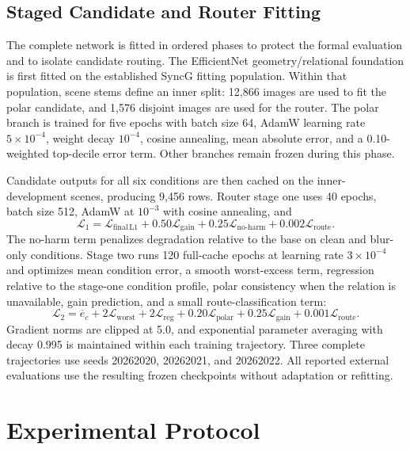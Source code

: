 \documentclass[electronics,article,submit,oneauthor]{Definitions/mdpi}
\begin{document}
\subsection{Staged Candidate and Router Fitting}
\label{subsec:training}

The complete network is fitted in ordered phases to protect the formal evaluation and to isolate candidate routing. The EfficientNet geometry/relational foundation is first fitted on the established SyncG fitting population. Within that population, scene stems define an inner split: 12,866 images are used to fit the polar candidate, and 1,576 disjoint images are used for the router. The polar branch is trained for five epochs with batch size 64, AdamW learning rate $5\times10^{-4}$, weight decay $10^{-4}$, cosine annealing, mean absolute error, and a 0.10-weighted top-decile error term. Other branches remain frozen during this phase.

Candidate outputs for all six conditions are then cached on the inner-development scenes, producing 9,456 rows. Router stage one uses 40 epochs, batch size 512, AdamW at $10^{-3}$ with cosine annealing, and
\begin{equation}
\mathcal{L}_1=\mathcal{L}_{\mathrm{final\,L1}}+0.50\mathcal{L}_{\mathrm{gain}}
+0.25\mathcal{L}_{\mathrm{no\mbox{-}harm}}+0.002\mathcal{L}_{\mathrm{route}}.
\label{eq:router_stage1}
\end{equation}
The no-harm term penalizes degradation relative to the base on clean and blur-only conditions. Stage two runs 120 full-cache epochs at learning rate $3\times10^{-4}$ and optimizes mean condition error, a smooth worst-excess term, regression relative to the stage-one condition profile, polar consistency when the relation is unavailable, gain prediction, and a small route-classification term:
\begin{equation}
\mathcal{L}_2=\overline{e}_{c}+2\mathcal{L}_{\mathrm{worst}}+2\mathcal{L}_{\mathrm{reg}}
+0.20\mathcal{L}_{\mathrm{polar}}+0.25\mathcal{L}_{\mathrm{gain}}+0.001\mathcal{L}_{\mathrm{route}}.
\label{eq:router_stage2}
\end{equation}
Gradient norms are clipped at 5.0, and exponential parameter averaging with decay 0.995 is maintained within each training trajectory. Three complete trajectories use seeds 20262020, 20262021, and 20262022. All reported external evaluations use the resulting frozen checkpoints without adaptation or refitting.

\section{Experimental Protocol}
\label{sec:protocol}
\end{document}
